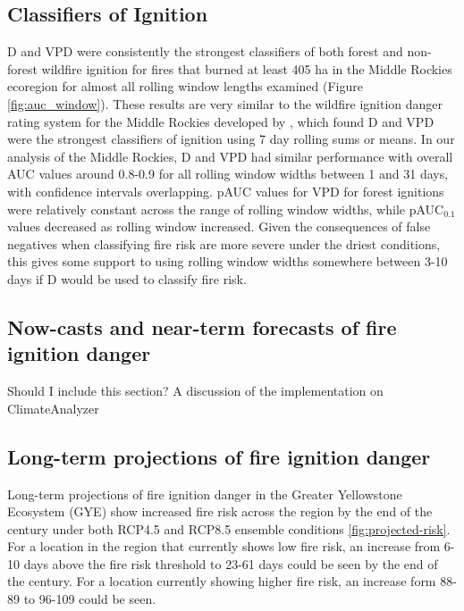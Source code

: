 \documentclass[11pt]{article}
\begin{document}
\subsection{Classifiers of Ignition}
D and VPD were consistently the strongest classifiers of both forest and non-forest wildfire ignition for fires that burned at least 405 ha in the Middle Rockies ecoregion for almost all rolling window lengths examined (Figure \ref{fig:auc_window}).  These results are very similar to the wildfire ignition danger rating system for the Middle Rockies developed by , which found D and VPD were the strongest classifiers of ignition using 7 day rolling sums or means.  In our analysis of the Middle Rockies, D and VPD had similar performance with overall AUC values around 0.8-0.9 for all rolling window widths between 1 and 31 days, with confidence intervals overlapping.  pAUC values for VPD for forest ignitions were relatively constant across the range of rolling window widths, while pAUC$_{0.1}$ values decreased as rolling window increased.  Given the consequences of false negatives when classifying fire risk are more severe under the driest conditions, this gives some support to using rolling window widths somewhere between 3-10 days if D would be used to classify fire risk.




\subsection{Now-casts and near-term forecasts of fire ignition danger}

Should I include this section? A discussion of the implementation on ClimateAnalyzer

\subsection{Long-term projections of fire ignition danger}

Long-term projections of fire ignition danger in the Greater Yellowstone Ecosystem (GYE) show increased fire risk across the region by the end of the century under both RCP4.5 and RCP8.5 ensemble conditions \ref{fig:projected-risk}.  For a location in the region that currently shows low fire risk, an increase from 6-10 days above the fire risk threshold to 23-61 days could be seen by the end of the century.  For a location currently showing higher fire risk, an increase form 88-89 to 96-109 could be seen.




\clearpage

\printbibliography[
heading=bibintoc,
title={References}
]
\end{document}
